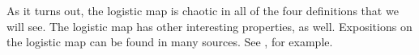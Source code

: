 \documentclass[10pt,twoside,draft]{book}
\begin{document}
As it turns out, the logistic map is chaotic in all of the four definitions that we will see.
The logistic map has other interesting properties, as well.
Expositions on the logistic map can be found in many sources.
See \citep{may1, may2, devaney}, for example.

%
\end{document}
